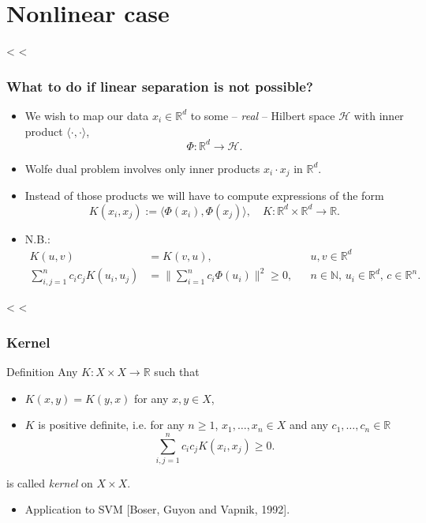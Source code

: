 \documentclass{beamer}
\begin{document}
\section{Nonlinear case}
\label{sec:nonlinear_case}

<%
<%
\begin{frame}[c]\frametitle{What to do if linear separation is not possible?}
	\begin{itemize}
		\item We wish to map our data $x_i \in \mathbb{R}^d$ to some -- \emph{real} -- Hilbert space $\mathscr{H}$ with inner product $\langle \cdot,\cdot \rangle$,
			\[
				\Phi: \mathbb{R}^d \to \mathscr{H}.
			\]
		\vfill
		\item Wolfe dual problem involves only inner products $x_i \cdot x_j$ in $\mathbb{R}^d$.
		\vfill\pause
		\item Instead of those products we will have to compute expressions of the form
			\[
				K(x_i,x_j) := \langle \Phi(x_i), \Phi(x_j) \rangle, \quad K : \mathbb{R}^d \times \mathbb{R}^d \to \mathbb{R}.
			\]
		\vfill\pause
		\item N.B.:
			\begin{align*}
				K(u,v) &= K(v,u), & &u,v \in\mathbb{R}^d \\
				\sum_{i,j=1}^n \! c_i c_j K(u_i,u_j) &= \bigg\| \sum_{i=1}^n c_i \Phi(u_i) \bigg\|^2 \geq 0, & &n\in\mathbb{N}, \, u_i \in \mathbb{R}^d, \,c\in\mathbb{R}^n.
			\end{align*}
	\end{itemize}
\end{frame}

<%
<%
\begin{frame}[c]\frametitle{Kernel}
	\begin{block}{Definition}
		Any $K: X \times X \to \mathbb{R}$ such that
		\begin{itemize}
			\item $K(x,y) = K(y,x)$ for any $x,y \in X$,
			\item $K$ is positive definite, i.e. for any $n \geq 1$, $x_1,\ldots,x_n \in X$ and any $c_1,\ldots,c_n \in \mathbb{R}$
			\[
				\sum_{i,j=1}^n c_i c_j K(x_i,x_j) \geq 0.
			\]
		\end{itemize}
		is called \emph{kernel} on $X \times X$.
	\end{block}
	\vfill
	\begin{itemize}
		\item Application to SVM [Boser, Guyon and Vapnik, 1992].
	\end{itemize}
\end{frame}
\end{document}
